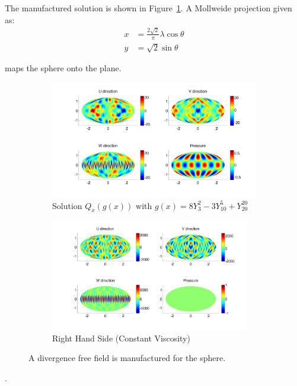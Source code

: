 The manufactured solution is shown in Figure~\ref{fig:manufactured_solution}. A Mollweide projection given as: 
\begin{align*}
x &= \frac{2\sqrt{2}}{\pi} \lambda \cos{\theta} \\
y &= \sqrt{2}\sin{\theta}
\end{align*}

 maps the sphere onto the plane. 

\begin{figure} 
\centering
\begin{subfigure}[b]{\textwidth}
\centering
\includegraphics[width=1.0\textwidth]{../figures/paper2/figures/U_exact.png}
\caption{Solution $Q_x( g(x) )$ with $g(x) = 8 Y_{3}^{2} - 3Y_{10}^{5} + Y_{20}^{20}$}
\end{subfigure}
\begin{subfigure}[b]{\textwidth}
\centering
\includegraphics[width=0.95\textwidth]{../figures/paper2/figures/RHS.png}
\caption{Right Hand Side (Constant Viscosity)}
\end{subfigure}
\caption{A divergence free field is manufactured for the sphere. }
\label{fig:manufactured_solution}
\end{figure} 
%
%
%
. 




